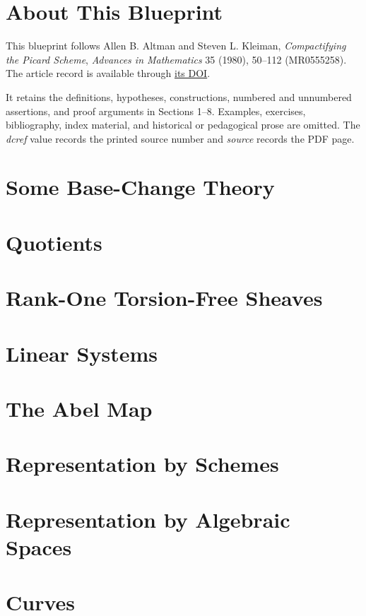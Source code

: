 

\chapter*{About This Blueprint}
This blueprint follows Allen B. Altman and Steven L. Kleiman, \emph{Compactifying
the Picard Scheme}, \emph{Advances in Mathematics} 35 (1980), 50--112
(MR0555258).  The article record is available through
\href{https://doi.org/10.1016/0001-8708(80)90043-2}{its DOI}.

It retains the definitions, hypotheses, constructions, numbered and unnumbered
assertions, and proof arguments in Sections 1--8.  Examples, exercises,
bibliography, index material, and historical or pedagogical prose are omitted.
The \emph{dcref} value records the printed source number and \emph{source}
records the PDF page.

\chapter{Some Base-Change Theory}
\label{akcp-ch-base-change}


\chapter{Quotients}
\label{akcp-ch-quotients}


\chapter{Rank-One Torsion-Free Sheaves}
\label{akcp-ch-rank-one}


\chapter{Linear Systems}
\label{akcp-ch-linear-systems}


\chapter{The Abel Map}
\label{akcp-ch-abel-map}


\chapter{Representation by Schemes}
\label{akcp-ch-schemes}


\chapter{Representation by Algebraic Spaces}
\label{akcp-ch-spaces}


\chapter{Curves}
\label{akcp-ch-curves}

